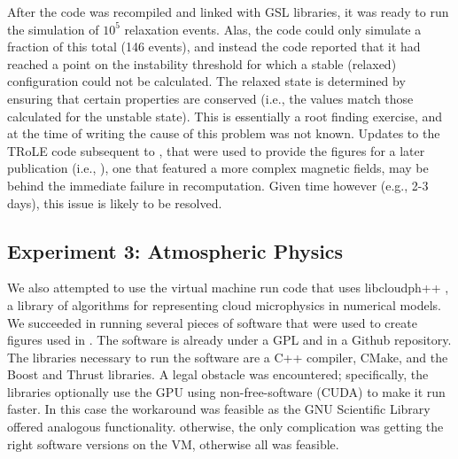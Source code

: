 After the code was recompiled and linked with GSL libraries, it was ready to run the simulation of $10^5$ relaxation
events. Alas, the code could only simulate a fraction of this total (146 events), and instead the code reported
that it had reached a point on the instability threshold for which a stable (relaxed) configuration could not be calculated.
The relaxed state is determined by ensuring that certain properties are conserved (i.e., the values match those
calculated for the unstable state). This is essentially a root finding exercise, and at the time of writing
the cause of this problem was not known. Updates to the TRoLE code subsequent to \cite{bareford2010nanoflare}, that were
used to provide the figures for a later publication (i.e., \cite{bareford2011flare}), one that featured a more complex magnetic
fields, may be behind the immediate failure in recomputation. Given time however (e.g., 2-3 days), this issue
is likely to be resolved. 

\subsection*{Experiment 3: Atmospheric Physics}

We also attempted to use the virtual machine run code that uses libcloudph++ \cite{arabas2013libcloud}, a library of algorithms
for representing cloud microphysics in numerical models. We succeeded in running several pieces of software that were used to create figures used in \cite{arabas2013libcloud}. The software is already under a GPL and in a Github repository. The libraries necessary to run the software are a C++ compiler, CMake, and the Boost and Thrust libraries.
A legal obstacle was encountered; specifically, the libraries optionally use the GPU using non-free-software (CUDA) to make it run faster. In this case the workaround was feasible as the GNU Scientific Library offered analogous functionality. otherwise, the only complication was getting the right software versions on the VM, otherwise all was feasible.
